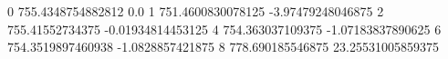 0 755.4348754882812 0.0
1 751.4600830078125 -3.97479248046875
2 755.41552734375 -0.01934814453125
4 754.363037109375 -1.07183837890625
6 754.3519897460938 -1.0828857421875
8 778.690185546875 23.25531005859375
